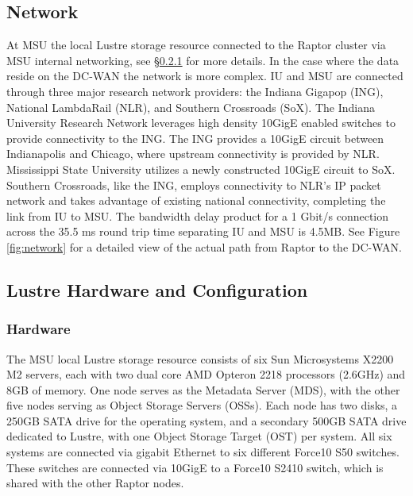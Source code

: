 \documentclass[]{sig-alternate}
\begin{document}
\subsection{Network}
At MSU the local Lustre storage resource connected to the Raptor cluster via MSU internal networking, see \S\ref{sec:hardware} for more details.
In the case where the data reside on the DC-WAN the network is more complex. 
IU and MSU are connected through three major research network providers: the Indiana Gigapop (ING), National LambdaRail (NLR), and Southern Crossroads (SoX).  The Indiana University Research Network leverages high density 10GigE enabled switches  to provide connectivity to the ING.  The ING provides a 10GigE circuit between Indianapolis and Chicago, where upstream connectivity is provided by NLR.  Mississippi State University utilizes a newly constructed 10GigE circuit to SoX.  Southern Crossroads, like the ING, employs connectivity to NLR's IP packet network and takes advantage of existing national connectivity, completing the link from IU to MSU. The bandwidth delay product  for a 1 Gbit/s connection across the 35.5 ms round trip time separating IU
and MSU is 4.5MB. See Figure \ref{fig:network} for a detailed view of the actual path from Raptor to the DC-WAN.

\subsection{Lustre Hardware and Configuration}
\subsubsection{Hardware}\label{sec:hardware}
The MSU local Lustre storage resource consists of six Sun Microsystems X2200 M2 servers, each with two dual core AMD Opteron 2218 processors (2.6GHz) and 8GB of memory.  One node serves as the Metadata Server (MDS), with the other five nodes serving as Object Storage Servers (OSSs). Each node has two disks, a 250GB SATA drive for the operating system, and a secondary 500GB SATA drive dedicated to Lustre, with one Object Storage Target (OST) per system.  All six systems are connected via gigabit Ethernet to six different Force10 S50 switches.  These switches are connected via 10GigE to a Force10 S2410 switch, which is shared with the other Raptor nodes. 
\end{document}
